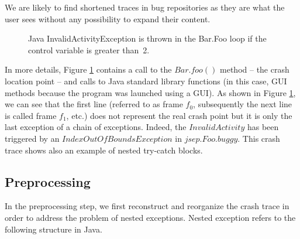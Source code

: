 \documentclass[12pt]{report}
\begin{document}
We are likely to find shortened traces in bug repositories as they are
what the user sees without any possibility to expand their content.

\begin{figure}
  \noindent{}
    \caption{Java InvalidActivityException is thrown in the Bar.Foo loop if the control variable is greater than~2.
    \label{fig:jcarming-traces}}
\end{figure}

In more details, Figure \ref{fig:jcarming-traces} contains a call to the
\(Bar.foo()\) method -- the crash location point -- and calls to Java
standard library functions (in this case, GUI methods because the
program was launched using a GUI). As shown in Figure
\ref{fig:jcarming-traces}, we can see that the first line (referred to
as frame \emph{\(f_0\)}, subsequently the next line is called frame
\emph{\(f_1\)}, etc.) does not represent the real crash point but it is
only the last exception of a chain of exceptions. Indeed, the
\(InvalidActivity\) has been triggered by an
\(IndexOutOfBoundsException\) in \(jsep.Foo.buggy\). This crash trace
shows also an example of nested try-catch blocks.

\subsection{Preprocessing}\label{preprocessing}

In the preprocessing step, we first reconstruct and reorganize the crash
trace in order to address the problem of nested exceptions. Nested
exception refers to the following structure in Java.

\noindent{}
\end{document}
